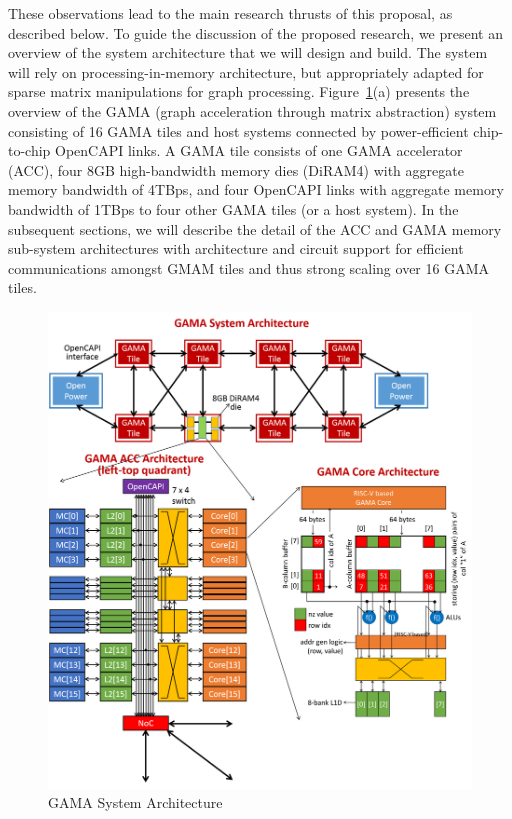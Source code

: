 These observations lead to the main research thrusts of this proposal, as described below. 
To guide the discussion of the proposed research, we present an overview of the system architecture that we will design and build. 
The system will rely on processing-in-memory architecture, but appropriately adapted for sparse matrix manipulations for graph processing. 
Figure~\ref{fig:arch}(a) presents the overview of the GAMA (graph acceleration through matrix abstraction) system consisting of 16 GAMA tiles and host systems connected by power-efficient chip-to-chip OpenCAPI links.
A GAMA tile consists of one GAMA accelerator (ACC), four 8GB high-bandwidth memory dies (DiRAM4) with aggregate memory bandwidth of 4TBps, and four OpenCAPI links with aggregate memory bandwidth of 1TBps to four other GAMA tiles (or a host system).
In the subsequent sections, we will describe the detail of the ACC and GAMA memory sub-system architectures with 
architecture and circuit support for efficient communications amongst GMAM tiles and thus strong scaling over 16 GAMA tiles.


\begin{figure}
\center
\includegraphics[width=1.0\linewidth]{fig/arch.png}
\caption{GAMA System Architecture}
\label{fig:arch}
\end{figure}


